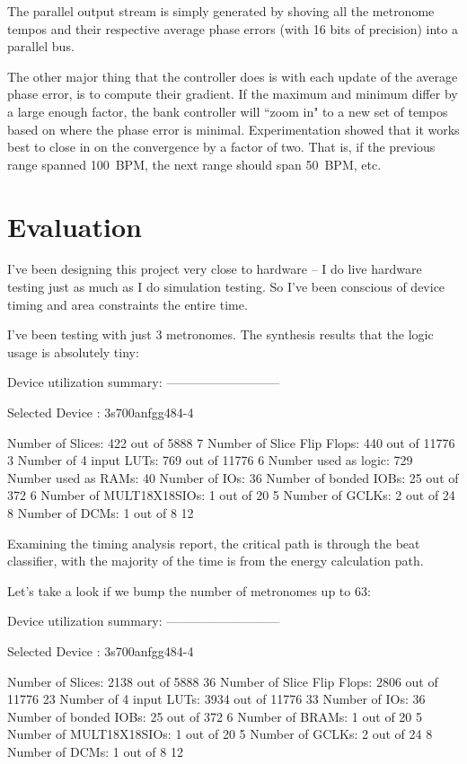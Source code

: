 \documentclass[letterpaper]{article}
\begin{document}
        The parallel output stream is simply generated by shoving all the metronome
        tempos and their respective average phase errors (with 16 bits of precision)
        into a parallel bus.

        The other major thing that the controller does is with each update of the
        average phase error, is to compute their gradient.  If the maximum and
        minimum differ by a large enough factor, the bank controller will ``zoom
        in" to a new set of tempos based on where the phase error is minimal.
        Experimentation showed that it works best to close in on the convergence by
        a factor of two.  That is, if the previous range spanned 100~BPM, the next
        range should span 50~BPM, etc.


\section{Evaluation}
    I've been designing this project very close to hardware -- I do live
    hardware testing just as much as I do simulation testing.  So I've been
    conscious of device timing and area constraints the entire time.

    I've been testing with just 3 metronomes. The synthesis results that the
    logic usage is absolutely tiny:

\begin{monospace}
Device utilization summary:
---------------------------

Selected Device : 3s700anfgg484-4 

 Number of Slices:           422  out of   5888     7%
 Number of Slice Flip Flops: 440  out of  11776     3%
 Number of 4 input LUTs:     769  out of  11776     6%
    Number used as logic:    729
    Number used as RAMs:      40
 Number of IOs:               36
 Number of bonded IOBs:       25  out of    372     6%
 Number of MULT18X18SIOs:      1  out of     20     5%
 Number of GCLKs:              2  out of     24     8%
 Number of DCMs:               1  out of      8    12%
\end{monospace}

Examining the timing analysis report, the critical path is through the beat
classifier, with the majority of the time is from the energy calculation path.

Let's take a look if we bump the number of metronomes up to 63:
\begin{monospace}
Device utilization summary:
---------------------------

Selected Device : 3s700anfgg484-4 

 Number of Slices:           2138  out of   5888    36%
 Number of Slice Flip Flops: 2806  out of  11776    23%
 Number of 4 input LUTs:     3934  out of  11776    33%
 Number of IOs:                36
 Number of bonded IOBs:        25  out of    372     6%
 Number of BRAMs:               1  out of     20     5%
 Number of MULT18X18SIOs:       1  out of     20     5%
 Number of GCLKs:               2  out of     24     8%
 Number of DCMs:                1  out of      8    12%
\end{monospace}
\end{document}
